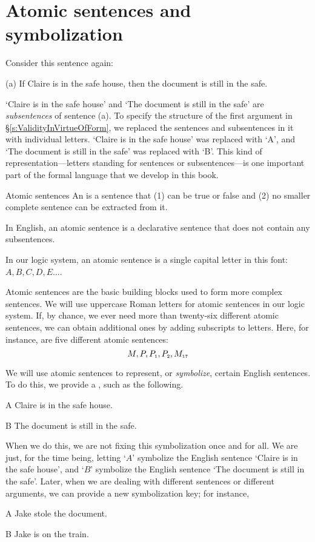 \filbreak
\section{Atomic sentences and symbolization}\label{s:atomic}

Consider this sentence again:
	\begin{earg}
		\item[(a)] If Claire is in the safe house, then the document is still in the safe.
	\end{earg}
`Claire is in the safe house' and `The document is still in the safe' are \textit{subsentences} of sentence (a). To specify the structure of the first argument in \S\ref{s:ValidityInVirtueOfForm}, we replaced the sentences and subsentences in it with individual letters. `Claire is in the safe house' was replaced with `A', and `The document is still in the safe' was replaced with `B'. This kind of representation---letters standing for sentences or subsentences---is one important part of the formal language that we develop in this book.

\begin{factboxy}{Atomic sentences}
An  is a sentence that (1) can be true or false and (2) no smaller complete sentence can be extracted from it.\medskip

In English, an atomic sentence is a declarative sentence that does not contain any subsentences.\smallskip

In our logic system, an atomic sentence is a single capital letter in this font: $A, B, C, D, E . . .$.
\end{factboxy}

Atomic sentences are the basic building blocks used to form more complex sentences. We will use uppercase Roman letters for atomic sentences in our logic system. If, by chance, we ever need more than twenty-six different atomic sentences, we can obtain additional ones by adding subscripts to letters. Here, for instance, are five different atomic sentences:
	$$M, P, P_{\text{\tiny 1}}, P_{\text{\tiny 2}}, M_{\text{\tiny 17}}$$

We will use atomic sentences to represent, or \emph{symbolize}, certain English sentences. To do this, we provide a , such as the following.
	\begin{ekey}
		\item[A] Claire is in the safe house.
		\item[B] The document is still in the safe.
	\end{ekey}
When we do this, we are not fixing this symbolization once and for all. We are just, for the time being, letting `$A$' symbolize the English sentence `Claire is in the safe house', and `$B$' symbolize the English sentence `The document is still in the safe'. Later, when we are dealing with different sentences or different arguments, we can provide a new symbolization key; for instance, 
	\begin{ekey}
		\item[A] Jake stole the document.
		\item[B] Jake is on the train.
	\end{ekey}



